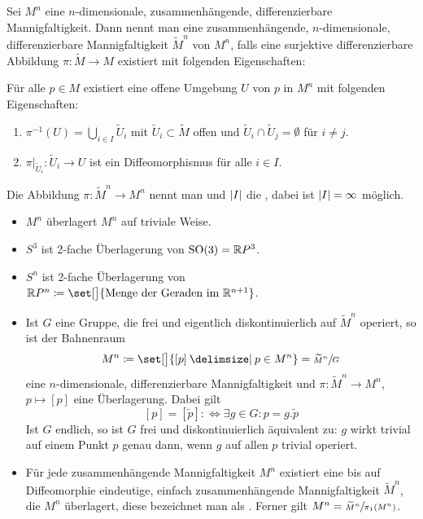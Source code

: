 \begin{definition}[{name=[Überlagerung]}]
    Sei $M^n$ eine $n$-dimensionale, zusammenhängende, differenzierbare Mannigfaltigkeit.
    Dann nennt man eine zusammenhängende, $n$-dimensionale, differenzierbare Mannigfaltigkeit $\widetilde{M}^n$  von $M^n$, falls eine surjektive differenzierbare Abbildung $\pi \colon \widetilde{M} \to M$ existiert mit folgenden Eigenschaften:
    
    Für alle $p \in M$ existiert eine offene Umgebung $U$ von $p$ in $M^n$ mit folgenden Eigenschaften:
    \begin{enumerate}[1),itemsep=1pt]
        \item $\pi^{-1}(U) = \bigcup_{i \in I} \widetilde{U}_i$ mit $\widetilde{U}_i \subset \widetilde{M}$ offen und $\widetilde{U}_i \cap \widetilde{U}_j = \emptyset$ für $i \neq j$.
        \item $\pi\big|_{\widetilde{U}_i} \colon \widetilde{U}_i \to U$ ist ein Diffeomorphismus für alle $i \in I$.
    \end{enumerate}
    Die Abbildung $\pi \colon \widetilde{M}^n \to M^n$ nennt man  und $\abs*{I}$ die , dabei ist $\abs*{I}= \infty$ möglich.
\end{definition}


\begin{beispiel*}[{name=[Überlagerungen]}]
	\leavevmode
	\begin{itemize}[itemsep=2pt]
	    \item $M^n$ überlagert $M^n$ auf triviale Weise.
	    \item $S^3$ ist 2-fache Überlagerung von $\SO(3) = \mathbb{R}P^3$.
	    \item $S^n$ ist 2-fache Überlagerung von $\mathbb{R}P^n \coloneqq \set[\big]{\text{Menge der Geraden im }\mathbb{R}^{n+1}}$.
	    \item Ist $G$ eine Gruppe, die frei und eigentlich diskontinuierlich auf $\widetilde{M}^n$ operiert, so ist der Bahnenraum
	    \[
	        M^n \coloneqq \set[\big]{[p] \given p \in M^n} = \sfrac{\widetilde{M}^n}{G}
	    \]
	    eine $n$-dimensionale, differenzierbare Mannigfaltigkeit und $\pi \colon \widetilde{M}^n \to M^n$, $p \mapsto [p]$ eine Überlagerung.
		Dabei gilt
	    \[
	        [p] = [\tilde{p}] :\Longleftrightarrow \exists g \in G : p = g . \tilde{p}
	    \]
	    Ist $G$ endlich, so ist $G$ frei und diskontinuierlich äquivalent zu: $g$ wirkt trivial auf einem Punkt $p$ genau dann, wenn $g$ auf allen $p$ trivial operiert.
	    \item Für jede zusammenhängende Mannigfaltigkeit $M^n$ existiert eine bis auf Diffeomorphie eindeutige, einfach zusammenhängende Mannigfaltigkeit $\widetilde{M}^n$, die $M^n$ überlagert, diese bezeichnet man als .
	    Ferner gilt $M^n = \sfrac{\widetilde{M}^n}{\pi_1(M^n)}$.
	\end{itemize}
\end{beispiel*}



